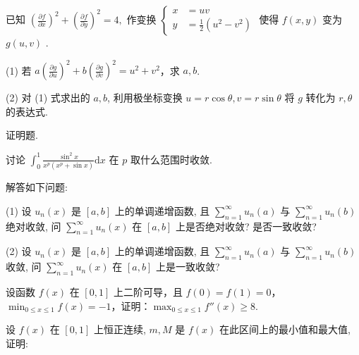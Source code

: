 已知  $\left(\frac{\partial f}{\partial x}\right)^{2} + \left(\frac{\partial f}{\partial y}\right)^{2} = 4,$  作变换  $\left\{\begin{aligned}x &= uv \\ y &= \frac{1}{2}(u^{2} - v^{2})\end{aligned}\right.$  使得  $f(x,y)$  变为  $g(u,v)$ .\par
(1) 若 $a\left(\frac{\partial g}{\partial u}\right)^2 + b\left(\frac{\partial g}{\partial v}\right)^2 = u^2 + v^2$，求 $a, b$.\par
(2) 对 (1) 式求出的 $a, b$, 利用极坐标变换 $u = r \cos \theta, v = r \sin \theta$ 将 $g$ 转化为 $r, \theta$ 的表达式.\par
\par{}
证明题.\par
讨论 $\int_0^1\frac{\sin^2x}{x^p(x^p + \sin x)}\mathrm{d}x$ 在 $p$ 取什么范围时收敛.\par
解答如下问题:\par
(1) 设 $u_{n}(x)$ 是 $[a, b]$ 上的单调递增函数, 且 $\sum_{n=1}^{\infty} u_{n}(a)$ 与 $\sum_{n=1}^{\infty} u_{n}(b)$ 绝对收敛, 问 $\sum_{n=1}^{\infty} u_{n}(x)$ 在 $[a, b]$ 上是否绝对收敛? 是否一致收敛?\par
(2) 设 $u_{n}(x)$ 是 $[a, b]$ 上的单调递增函数, 且 $\sum_{n=1}^{\infty} u_{n}(a)$ 与 $\sum_{n=1}^{\infty} u_{n}(b)$ 收敛, 问 $\sum_{n=1}^{\infty} u_{n}(x)$ 在 $[a, b]$ 上是一致收敛?\par
设函数 $f(x)$ 在 $[0,1]$ 上二阶可导，且 $f(0) = f(1) = 0$，$\min_{0 \leq x \leq 1} f(x) = -1$，证明：$\max_{0 \leq x \leq 1} f''(x) \geq 8$.\par
\par{}
设 $f(x)$ 在 $[0,1]$ 上恒正连续, $m, M$ 是 $f(x)$ 在此区间上的最小值和最大值, 证明:\par
\nopagebreak[4]
